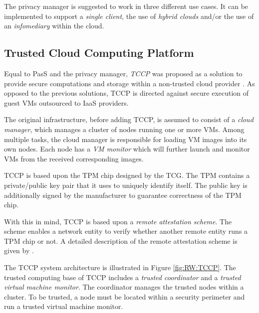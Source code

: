\documentclass[pdftex,english,10pt,b5paper,twoside]{book}
\begin{document}
The privacy manager is suggested to work in three different use cases. It can
be implemented to support a \emph{single client}, the use of \emph{hybrid
clouds} and/or the use of an \emph{infomediary} within the cloud.


\subsection{Trusted Cloud Computing Platform}

Equal to \acl{PasS} and the privacy manager, \emph{\ac{TCCP}} was proposed as a
solution to provide secure computations and storage within a non-trusted cloud
provider \cite{tccp}. As opposed to the previous solutions, \ac{TCCP} is
directed against secure execution of guest \acp{VM} outsourced to \ac{IaaS}
providers.

The original infrastructure, before adding \ac{TCCP}, is assumed to
consist of a \emph{cloud manager}, which manages a cluster of nodes running one or more
\acp{VM}. Among multiple tasks, the cloud manager is responsible for loading \ac{VM}
images into its own nodes.  Each node has a \emph{\ac{VM} monitor} which will further
launch and monitor \acp{VM} from the received corresponding images.

\ac{TCCP} is based upon the \acf{TPM} chip designed by the \acl{TCG}. The
\ac{TPM} contains a private/public key pair that it uses to uniquely identify
itself. The public key is additionally signed by the manufacturer to guarantee
correctness of the \ac{TPM} chip.

With this in mind, \ac{TCCP} is based upon a \emph{remote attestation scheme}.
The scheme enables a network entity to verify whether another remote entity
runs a \ac{TPM} chip or not. A detailed description of the remote attestation scheme
is given by \citet{tccp}.

The \ac{TCCP} system architecture is illustrated in Figure \ref{fig:RW:TCCP}.
The trusted computing base of \ac{TCCP} includes a \emph{trusted coordinator}
and a \emph{trusted virtual machine monitor}. The coordinator manages the
trusted nodes within a cluster. To be trusted, a node must be located within a
security perimeter and run a trusted virtual machine monitor.
\end{document}

